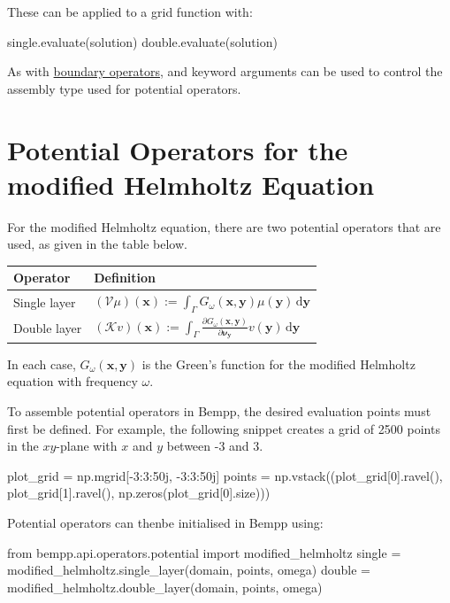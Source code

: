 \documentclass[a4paper]{book}
\begin{document}
These can be applied to a grid function with:
\begin{python}
single.evaluate(solution)
double.evaluate(solution)
\end{python}

As with \href{helmholtz_boundary_operators.md}{boundary operators},  and 
keyword arguments can be used to control the assembly type used for potential operators.


\section{Potential Operators for the modified Helmholtz Equation}

For the modified Helmholtz equation, there are two potential operators that are used, as given in the table
below.

\begin{center}
\begin{tabular}{|l|l|}
\hline
Operator             & Definition\\
\hline
Single layer         & $\displaystyle (\mathcal{V}\mu)(\mathbf{x}) := \int_{\Gamma} G_\omega(\mathbf{x},\mathbf{y}) \mu(\mathbf{y})\,\mathrm{d}\mathbf{y}$\\
Double layer         & $\displaystyle (\mathcal{K}v)(\mathbf{x}) := \int_{\Gamma} \frac{\partial G_\omega(\mathbf{x},\mathbf{y})}{\partial\mathbf{\nu}_{\mathbf{y}}} v(\mathbf{y})\,\mathrm{d}\mathbf{y}$\\
\hline
\end{tabular}
\end{center}

In each case, $G_\omega(\mathbf{x},\mathbf{y})$ is the Green's function for the modified Helmholtz equation
with frequency $\omega$.

To assemble potential operators in Bempp, the desired evaluation points must first be defined.
For example, the following snippet creates a grid of 2500 points in the $x$$y$-plane with
$x$ and $y$ between -3 and 3.

\begin{python}
plot_grid = np.mgrid[-3:3:50j, -3:3:50j]
points = np.vstack((plot_grid[0].ravel(),
                    plot_grid[1].ravel(),
                    np.zeros(plot_grid[0].size)))
\end{python}

Potential operators can thenbe initialised in Bempp using:
\begin{python}
from bempp.api.operators.potential import modified_helmholtz
single = modified_helmholtz.single_layer(domain, points, omega)
double = modified_helmholtz.double_layer(domain, points, omega)
\end{python}
\end{document}
